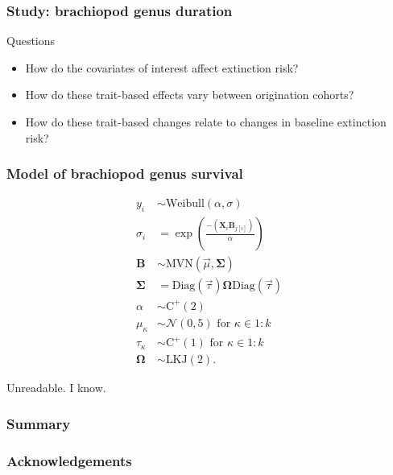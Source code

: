 \documentclass{beamer}
\begin{document}
\begin{frame}
  \frametitle{Study: brachiopod genus duration}
  \begin{alertblock}{Questions}
    \begin{itemize}
      \item How do the covariates of interest affect extinction risk?
      \item How do these trait-based effects vary between origination cohorts?
      \item How do these trait-based changes relate to changes in baseline extinction risk?
    \end{itemize}
  \end{alertblock}
\end{frame}

\begin{frame}
  \frametitle{Model of brachiopod genus survival}
  \begin{align*}
    y_{i} &\sim \mathrm{Weibull}(\alpha, \sigma) \\
    \sigma_{i} &= \exp\left(\frac{-(\mathbf{X}_{i} \mathbf{B}_{j[i]})}{\alpha}\right) \\
    \mathbf{B} &\sim \mathrm{MVN}(\vec{\mu}, \mathbf{\Sigma}) \\
    \mathbf{\Sigma} &= \text{Diag}(\vec{\tau}) \mathbf{\Omega} \text{Diag}(\vec{\tau}) \\
    \alpha &\sim \mathrm{C^{+}}(2) \\
    \mu_{\kappa} &\sim \mathcal{N}(0, 5) \text{ for } \kappa \in 1:k \\
    \tau_{\kappa} &\sim \mathrm{C^{+}}(1) \text{ for } \kappa \in 1:k \\
    \mathbf{\Omega} &\sim \text{LKJ}(2).
  \end{align*}

  \bigskip

  \footnotesize{Unreadable. I know.}
\end{frame}


%
%
\begin{frame}
  \frametitle{Summary}
\end{frame}

\begin{frame}
  \frametitle{Acknowledgements}
\end{frame}
\end{document}
